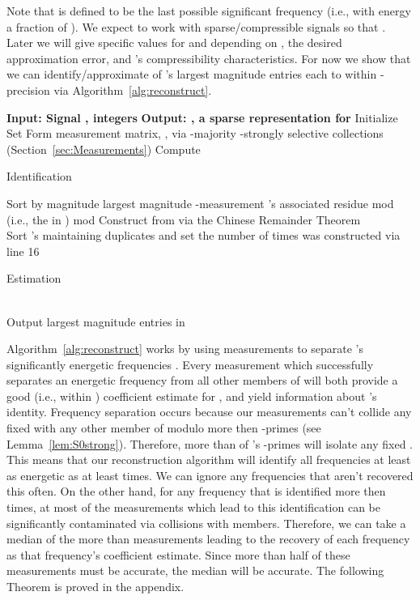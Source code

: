 \documentclass{article}
\begin{document}
Note that  is defined to be the last possible significant frequency (i.e., with energy  a fraction of ).
We expect to work with sparse/compressible signals so that .  Later we will give specific values for  and  depending on , the desired approximation error, and 's compressibility characteristics.  For now we show that we can identify/approximate  of 's largest magnitude entries each to within -precision via Algorithm~\ref{alg:reconstruct}.

\begin{algorithm}[tb]
\begin{algorithmic}[1]
\caption{} \label{alg:reconstruct}
\STATE \textbf{Input: Signal , integers } 
\STATE \textbf{Output: , a sparse representation for }
\STATE Initialize 
\STATE Set 
\STATE Form measurement matrix, , via -majority -strongly selective collections (Section~\ref{sec:Measurements})
\STATE Compute  \\
\begin{center}
{\sc Identification}
\end{center}
	\STATE Sort  by magnitude
		\STATE  largest magnitude -measurement
		\STATE  's associated residue mod  (i.e., the  in )
			\STATE 
			\STATE  mod 
		\ENDFOR
		\STATE Construct  from  via the Chinese Remainder Theorem
	\ENDFOR
\ENDFOR \\
\STATE Sort 's maintaining duplicates and set  the number of times  was constructed via line 16
\begin{center}
{\sc Estimation}
\end{center}
		\IF { }
			\STATE  
			\STATE 
			\STATE 
			\STATE 
		\ENDIF
	\ENDFOR
\ENDFOR \\
\STATE Output  largest magnitude entries in 
\end{algorithmic}
\end{algorithm}

Algorithm~\ref{alg:reconstruct} works by using  measurements to separate 's significantly energetic frequencies .  Every measurement which successfully separates an energetic frequency  from all other members of  will both  provide a good (i.e., within ) coefficient estimate for , and  yield information about 's identity.  Frequency separation occurs because our  measurements can't collide any fixed  with any other member of  modulo more then  -primes (see Lemma~\ref{lem:S0strong}).  Therefore, more than  of 's  -primes will isolate any fixed .  This means that our reconstruction algorithm will identify all frequencies at least as energetic as  at least  times.  We can ignore any frequencies that aren't recovered this often.  On the other hand, for any frequency that is identified more then  
times, at most  of the measurements which lead to this identification can be significantly contaminated via collisions with  members.  Therefore, we can take a median of the more than  measurements leading to the recovery of each frequency as that frequency's coefficient estimate.  Since more than half of these measurements must be accurate, the median will be accurate.  The following Theorem is proved in the appendix.
\end{document}
